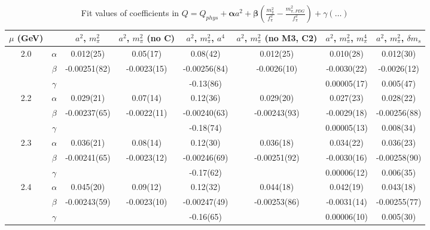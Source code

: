 \documentclass[12pt]{extarticle}
\begin{document}
\begin{table}[h!]
\begin{center}
\begin{tabular}{|c c|c|c|c|c|c|c|}
\hline
$\mu$ (GeV) &  & $a^2$, $m_\pi^2$& $a^2$, $m_\pi^2$ (no C)& $a^2$, $m_\pi^2$, $a^4$& $a^2$, $m_\pi^2$ (no M3, C2)& $a^2$, $m_\pi^2$, $m_\pi^4$& $a^2$, $m_\pi^2$, $\delta m_s$\\
\hline
\multirow{3}{0.5in}{2.0} & $\alpha$ & 0.012(25)& 0.05(17)& 0.08(42)& 0.012(25)& 0.010(28)& 0.012(30)\\
 & $\beta$ & -0.00251(82)& -0.0023(15)& -0.00256(84)& -0.0026(10)& -0.0030(22)& -0.0026(12)\\
 & $\gamma$ &  &  & -0.13(86)&  & 0.00005(17)& 0.005(47)\\
\hline
\multirow{3}{0.5in}{2.2} & $\alpha$ & 0.029(21)& 0.07(14)& 0.12(36)& 0.029(20)& 0.027(23)& 0.028(22)\\
 & $\beta$ & -0.00237(65)& -0.0022(11)& -0.00240(63)& -0.00243(93)& -0.0029(18)& -0.00256(88)\\
 & $\gamma$ &  &  & -0.18(74)&  & 0.00005(13)& 0.008(34)\\
\hline
\multirow{3}{0.5in}{2.3} & $\alpha$ & 0.036(21)& 0.08(14)& 0.12(30)& 0.036(18)& 0.034(22)& 0.036(23)\\
 & $\beta$ & -0.00241(65)& -0.0023(12)& -0.00246(69)& -0.00251(92)& -0.0030(16)& -0.00258(90)\\
 & $\gamma$ &  &  & -0.17(62)&  & 0.00006(12)& 0.006(35)\\
\hline
\multirow{3}{0.5in}{2.4} & $\alpha$ & 0.045(20)& 0.09(12)& 0.12(32)& 0.044(18)& 0.042(19)& 0.043(18)\\
 & $\beta$ & -0.00243(59)& -0.0023(10)& -0.00247(49)& -0.00253(86)& -0.0031(14)& -0.00255(77)\\
 & $\gamma$ &  &  & -0.16(65)&  & 0.00006(10)& 0.005(30)\\
\hline
\end{tabular}
\caption{Fit values of coefficients in $Q = Q_{phys} + \mathbf{\alpha} a^2 + \mathbf{\beta}\left(\frac{m_\pi^2}{f_\pi^2}-\frac{m_{\pi,PDG}^2}{f_\pi^2}\right) + \gamma(\ldots)$}
\end{center}
\end{table}






\end{document}
